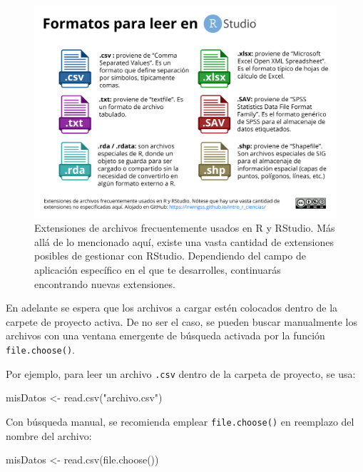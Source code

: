 \documentclass[
]{article}
\newenvironment{Shaded}{\begin{snugshade}}{\end{snugshade}}
\newcommand{\FunctionTok}[1]{\textcolor[rgb]{0.00,0.00,0.00}{#1}}
\newcommand{\NormalTok}[1]{#1}
\newcommand{\OtherTok}[1]{\textcolor[rgb]{0.56,0.35,0.01}{#1}}
\newcommand{\StringTok}[1]{\textcolor[rgb]{0.31,0.60,0.02}{#1}}
\theoremstyle{definition}
\theoremstyle{definition}
\theoremstyle{definition}
\theoremstyle{definition}
\theoremstyle{remark}
\begin{document}
\begin{figure}

{\centering \includegraphics[width=1\linewidth]{figs/elaboradas/Extensiones} 

}

\caption{Extensiones de archivos frecuentemente usados en R y RStudio. Más allá de lo mencionado aquí, existe una vasta cantidad de extensiones posibles de gestionar con RStudio. Dependiendo del campo de aplicación específico en el que te desarrolles, continuarás encontrando nuevas extensiones.}\label{fig:figura46}
\end{figure}

En adelante se espera que los archivos a cargar estén colocados dentro de la carpete de proyecto activa. De no ser el caso, se pueden buscar manualmente los archivos con una ventana emergente de búsqueda activada por la función \texttt{file.choose()}.

Por ejemplo, para leer un archivo \texttt{.csv} dentro de la carpeta de proyecto, se usa:

\begin{Shaded}
\begin{Highlighting}[]
\NormalTok{misDatos }\OtherTok{\textless{}{-}} \FunctionTok{read.csv}\NormalTok{(}\StringTok{"archivo.csv"}\NormalTok{)}
\end{Highlighting}
\end{Shaded}

Con búsqueda manual, se recomienda emplear \texttt{file.choose()} en reemplazo del nombre del archivo:

\begin{Shaded}
\begin{Highlighting}[]
\NormalTok{misDatos }\OtherTok{\textless{}{-}} \FunctionTok{read.csv}\NormalTok{(}\FunctionTok{file.choose}\NormalTok{())}
\end{Highlighting}
\end{Shaded}
\end{document}
